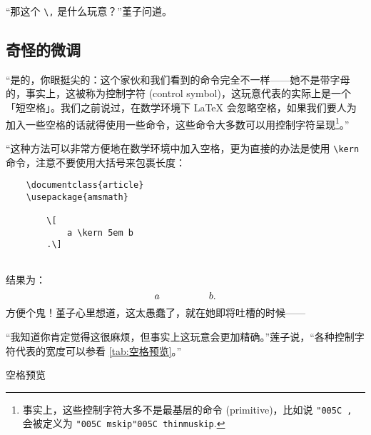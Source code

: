 “那这个 \verb"\," 是什么玩意？”堇子问道。


\subsection{奇怪的微调}

“是的，你眼挺尖的：这个家伙和我们看到的命令完全不一样——她不是带字母的，事实上，这被称为控制字符 (control symbol)，这玩意代表的实际上是一个「短空格」。我们之前说过，在数学环境下 \LaTeX{} 会忽略空格，如果我们要人为加入一些空格的话就得使用一些命令，这些命令大多数可以用控制字符呈现\footnote{事实上，这些控制字符大多不是最基层的命令 (primitive)，比如说 \texttt{\char"005C ,} 会被定义为 \texttt{\char"005C mskip\char"005C thinmuskip}.}。”


“这种方法可以非常方便地在数学环境中加入空格，更为直接的办法是使用 \verb"\kern" 命令，注意不要使用大括号来包裹长度：
\begin{lstlisting}
    \documentclass{article}
    \usepackage{amsmath}
    
        \[
            a \kern 5em b
        .\]
    
\end{lstlisting}

结果为：
\[
    a   \kern 5em b
    .\]
方便个鬼！堇子心里想道，这太愚蠢了，就在她即将吐槽的时候——

“我知道你肯定觉得这很麻烦，但事实上这玩意会更加精确。”莲子说，“各种控制字符代表的宽度可以参看 \autoref{tab:空格预览}。”

\begin{table}[ht]
    \centering
    \caption{空格预览}
    \label{tab:空格预览}
\end{table}

